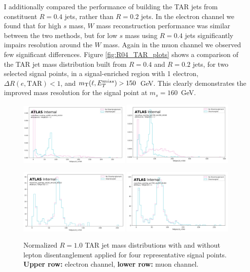 I additionally compared the performance of building the TAR jets from constituent \akt $R=0.4$ jets, rather than \akt $R=0.2$ jets.
In the electron channel we found that for high $s$ mass, $W$ mass reconstruction performance was similar between the two methods, but for low $s$ mass using \akt $R=0.4$ jets significantly impairs resolution around the $W$ mass.
Again in the muon channel we observed few significant differences.
Figure \ref{fig:R04_TAR_plots} shows a comparison of the TAR jet mass distribution built from \akt $R=0.4$ and \akt $R=0.2$ jets, for two selected signal points, in a signal-enriched region with 1 electron, $\Delta R(e, \text{TAR})< 1$, and $m_{\text{T}}(\ell, E_{T}^{miss}) > 150$~GeV. This clearly demonstrates the improved mass resolution for the signal point at $m_s = 160 $~GeV.
\begin{figure}[!h]
\centering
   \includegraphics[width = 0.49\textwidth]{Figures/4/TAR/monoSww_semilep_zp500_dm200_dh310.png}
   \includegraphics[width = 0.49\textwidth]{Figures/4/TAR/monoSww_semilep_zp1700_dm200_dh260.png}

   \includegraphics[width = 0.49\textwidth]{Figures/4/TAR/mu_monoSww_semilep_zp500_dm200_dh310.png}
   \includegraphics[width = 0.49\textwidth]{Figures/4/TAR/mu_monoSww_semilep_zp1700_dm200_dh260.png}

   \caption{Normalized $R=1.0$ TAR jet mass distributions with and without lepton disentanglement applied for four representative signal points. \textbf{Upper row:} electron channel, \textbf{lower row:} muon channel.}
   \label{fig:TARdisentaglementplots}
\end{figure}

